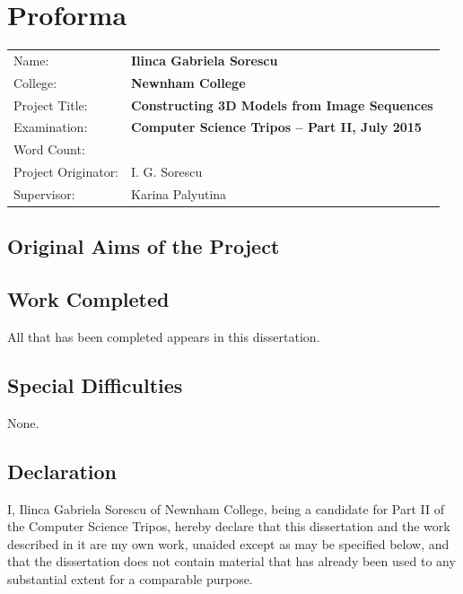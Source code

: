 \documentclass[12pt,a4paper,twoside,openright]{report}
\begin{document}

\pagestyle{plain}

\chapter*{Proforma}

{\large
\begin{tabular}{ll}
Name:               & \bf Ilinca Gabriela Sorescu                       \\
College:            & \bf Newnham College                               \\
Project Title:      & \bf Constructing 3D Models from Image Sequences   \\
Examination:        & \bf Computer Science Tripos -- Part II, July 2015  \\
Word Count:         & \bf  \\
Project Originator: & I. G. Sorescu                     \\
Supervisor:         & Karina Palyutina                  \\ 
\end{tabular}
}



\section*{Original Aims of the Project}




\section*{Work Completed}

All that has been completed appears in this dissertation.

\section*{Special Difficulties}
None.

\newpage
\section*{Declaration}

I, Ilinca Gabriela Sorescu of Newnham College, being a candidate for Part II of the Computer Science Tripos, hereby declare
that this dissertation and the work described in it are my own work,
unaided except as may be specified below, and that the dissertation
does not contain material that has already been used to any substantial
extent for a comparable purpose.
\end{document}
